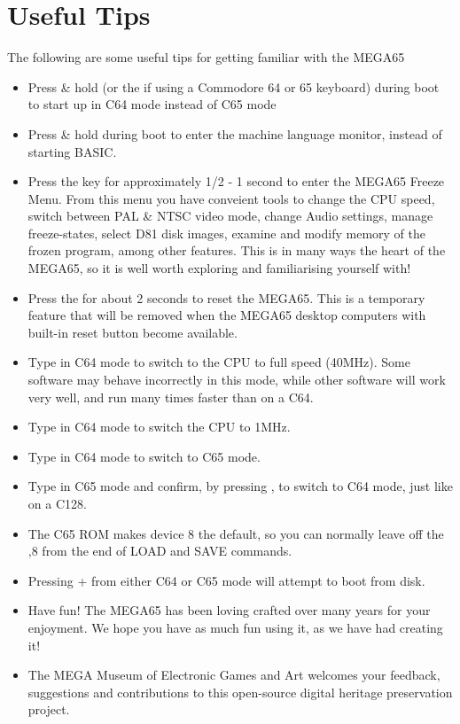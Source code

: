 \section{Useful Tips}

The following are some useful tips for getting familiar with the MEGA65

\begin{itemize}

\item{Press \& hold \megasymbolkey (or the  if using a Commodore 64 or 65 keyboard) during boot to start up in C64 mode instead of C65 mode}
 \item{Press \& hold  during boot to enter the machine language monitor, instead of starting BASIC.}
\item{Press the  key for approximately 1/2 - 1 second to enter the MEGA65 Freeze Menu.  From this menu
  you have conveient tools to change the CPU speed, switch between PAL \& NTSC video mode, change Audio settings, manage freeze-states,
   select D81 disk images, examine and modify memory of the frozen program, among other features.  This is in many ways the heart of the MEGA65, so it is well worth exploring and familiarising  yourself with!}
\item{Press the  for about 2 seconds to reset the MEGA65.  This is a temporary feature that will be removed when the MEGA65 desktop computers with built-in reset button become available.}
\item{Type  in C64 mode to switch to the CPU to full speed (40MHz). Some software may behave incorrectly in this mode, while other software will work very well, and run many times faster than on a C64.}
\item{Type  in C64 mode to switch the CPU to 1MHz.}
\item{Type  in C64 mode to switch to C65 mode.}
\item{Type  in C65 mode and confirm, by pressing , to switch to C64 mode, just like on a C128.}
\item{The C65 ROM makes device 8 the default, so you can normally leave off the ,8 from the end of LOAD and SAVE commands.}
\item{Pressing  +  from either C64 or C65 mode will attempt to boot from disk.}
\item{Have fun! The MEGA65 has been loving crafted over many years for your enjoyment. We hope you have as much fun using it, as we have had creating it!}
\item{The MEGA Museum of Electronic Games and Art welcomes your feedback, suggestions and contributions to this open-source digital heritage preservation project.}
\end{itemize}
